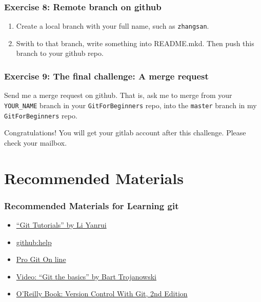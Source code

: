 \documentclass[11pt,ignorenonframetext,]{beamer}
\begin{document}
\begin{frame}[fragile]\frametitle{Exercise 8: Remote branch on github}
\begin{enumerate}[1.]
\item
  Create a local branch with your full name, such as \texttt{zhangsan}.
\item
  Swith to that branch, write something into README.mkd. Then push this branch to your github repo.
\end{enumerate}
\end{frame}

\begin{frame}[fragile]\frametitle{Exercise 9: The final challenge: A merge request}
  Send me a merge request on github. That is, ask me to merge from your \texttt{YOUR\_NAME} branch in your \texttt{GitForBeginners} repo, into the \texttt{master} branch in my \texttt{GitForBeginners} repo.

  Congratulations! You will get your gitlab account after this challenge. Please check your mailbox.
\end{frame}

\section{Recommended Materials}

\begin{frame}\frametitle{Recommended Materials for Learning git}

\begin{itemize}
\item
  \href{http://goo.gl/NBGgo}{``Git Tutorials'' by Li Yanrui}
\item
  \href{http://help.github.com/}{github:help}
\item
  \href{http://progit.org/book/}{Pro Git On line}
\item
  \href{http://excess.org/article/2008/07/ogre-git-tutorial/}{Video:
  ``Git the basics'' by Bart Trojanowski}
\item
  \href{http://shop.oreilly.com/product/0636920022862.do}{O'Reilly Book:
  Version Control With Git, 2nd Edition}
\end{itemize}
\end{frame}
\end{document}
